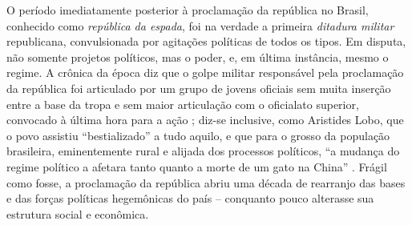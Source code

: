 O período imediatamente posterior à proclamação da república no Brasil, conhecido como \textit{república da espada}, foi na verdade a primeira \textit{ditadura militar} republicana, convulsionada por agitações políticas de todos os tipos. Em disputa, não somente projetos políticos, mas o poder, e, em última instância, mesmo o regime. A crônica da época diz que o golpe militar responsável pela proclamação da república foi articulado por um grupo de jovens oficiais sem muita inserção entre a base da tropa e sem maior articulação com o oficialato superior, convocado à última hora para a ação \cite[p.~16]{cardoso_govmil_1977}; diz-se inclusive, como Aristides Lobo, que o povo assistiu ``bestializado'' a tudo aquilo, e que para o grosso da população brasileira, eminentemente rural e alijada dos processos políticos, ``a mudança do regime político a afetara tanto quanto a morte de um gato na China'' \cite[p.~43]{basbaum_histsinc_1967}. Frágil como fosse, a proclamação da república abriu uma década de rearranjo das bases e das forças políticas hegemônicas do país -- conquanto pouco alterasse sua estrutura social e econômica.

